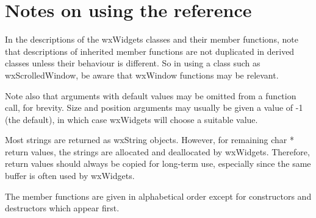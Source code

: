 \section{Notes on using the reference}\label{referencenotes}

In the descriptions of the wxWidgets classes and their member
functions, note that descriptions of inherited member functions are not
duplicated in derived classes unless their behaviour is different. So in
using a class such as wxScrolledWindow, be aware that wxWindow functions may be
relevant.

Note also that arguments with default values may be omitted from a
function call, for brevity. Size and position arguments may usually be
given a value of -1 (the default), in which case wxWidgets will choose a
suitable value.

Most strings are returned as wxString objects. However, for remaining
char * return values, the strings are allocated and
deallocated by wxWidgets. Therefore, return values should always be
copied for long-term use, especially since the same buffer is often
used by wxWidgets.

The member functions are given in alphabetical order except for
constructors and destructors which appear first.

